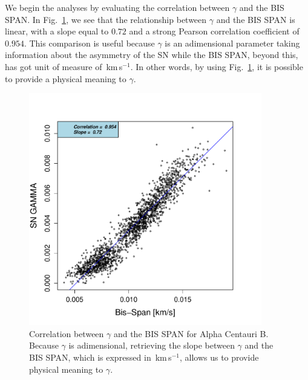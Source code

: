 \documentclass[11pt, oneside]{article}
\def\kms{\hbox{\,km\,s$^{-1}$}}       %
\begin{document}
{We begin the analyses by evaluating the correlation between $\gamma$ and the BIS SPAN. In Fig.~\ref{fig:alphacent:corr.gamma}, we see that the relationship between $\gamma$ and the BIS SPAN is linear, with a slope equal to $0.72$ and a strong Pearson correlation coefficient of $0.954$. This comparison is useful because $\gamma$ is an adimensional parameter taking information about the asymmetry of the SN while the BIS SPAN, beyond this, has got unit of measure of \kms. In other words, by using Fig.~\ref{fig:alphacent:corr.gamma}, it is possible to provide a physical meaning to $\gamma$.
%
\begin{figure}[htbp]
   \centering
\includegraphics[height = 4in]{HD12862_[2]gamma_vs_bisspan.pdf} 
   \caption{Correlation between $\gamma$ and the BIS SPAN for Alpha Centauri B. Because $\gamma$ is adimensional, retrieving the slope between $\gamma$ and the BIS SPAN, which is expressed in \kms, allows us to provide physical meaning to $\gamma$.}
   \label{fig:alphacent:corr.gamma}
\end{figure}
%

}
\end{document}
